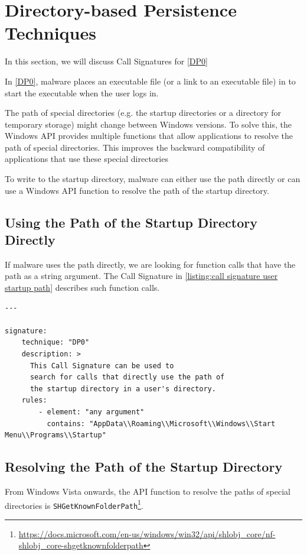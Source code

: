 \section{Directory-based Persistence Techniques}\label{section:call signatures dp}
In this section, we will discuss Call Signatures for \autoref{DP0}

In \autoref{DP0}, malware places an executable file (or a link to an executable file) in  to start the executable when the user logs in.

The path of special directories (e.g. the startup directories or a directory for temporary storage) might change between Windows versions. To solve this, the Windows API provides multiple functions that allow applications to resolve the path of special directories. This improves the backward compatibility of applications that use these special directories

To write to the startup directory, malware can either use the path directly or can use a Windows API function to resolve the path of the startup directory.

\subsection{Using the Path of the Startup Directory Directly}
If malware uses the path directly, we are looking for function calls that have the path as a string argument. The Call Signature in \autoref{listing:call signature user startup path} describes such function calls.

\begin{lstlisting}[label={listing:call signature user startup path}, caption={A Call Signature for \autoref{DP0}.}, captionpos=b]
---

signature:
    technique: "DP0"
    description: >
      This Call Signature can be used to
      search for calls that directly use the path of
      the startup directory in a user's directory.
    rules:
        - element: "any argument"
          contains: "AppData\\Roaming\\Microsoft\\Windows\\Start Menu\\Programs\\Startup"
\end{lstlisting}

\subsection{Resolving the Path of the Startup Directory}
From Windows Vista onwards, the API function to resolve the paths of special directories is \texttt{SHGetKnownFolderPath}\footnote{\tiny \url{https://docs.microsoft.com/en-us/windows/win32/api/shlobj_core/nf-shlobj_core-shgetknownfolderpath}}.

